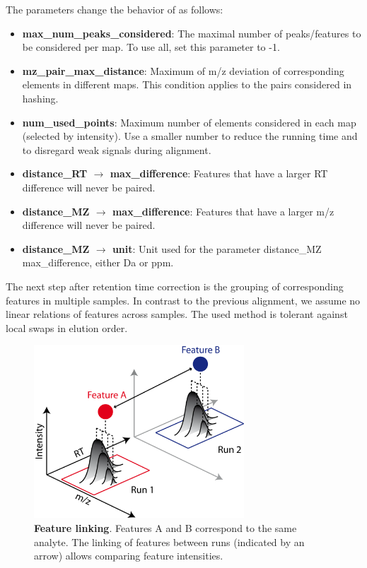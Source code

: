 \noindent The parameters change the behavior of  as follows:
\begin{itemize}
\item \textbf{max\_num\_peaks\_considered}: The maximal number of peaks/features to be considered per map. To use all, set this parameter to -1.
\item \textbf{mz\_pair\_max\_distance}: Maximum of m/z deviation of corresponding elements in different maps.  This condition applies to the pairs considered in hashing.
\item \textbf{num\_used\_points}: Maximum number of elements considered in each map (selected by intensity). Use a smaller number to reduce the running time and to disregard weak signals during alignment.
\item \textbf{distance\_RT $\rightarrow$ max\_difference}: Features that have a larger RT difference will never be paired.
\item \textbf{distance\_MZ $\rightarrow$ max\_difference}: Features that have a larger m/z difference will never be paired.
\item \textbf{distance\_MZ $\rightarrow$ unit}: Unit used for the parameter distance\_MZ max\_difference, either Da or ppm.
\end{itemize}

The next step after retention time correction is the grouping of corresponding features in multiple samples. In contrast to the previous alignment, we assume no linear relations of features across samples. The used method is tolerant against local swaps in elution order.

\begin{figure}[htb]
	\centering
	\includegraphics[width=0.7\textwidth]{graphics/metabo/link.png}
	\caption[Label-free quantification]
	{
	\textbf{Feature linking}. Features A and B correspond to the same analyte. The linking of features between runs (indicated by an arrow) allows comparing feature intensities.
	}
	\label{fig_bg_link}
\end{figure}

